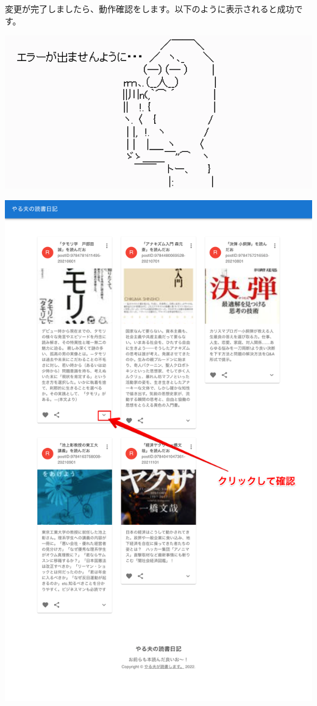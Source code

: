変更が完了しましたら、動作確認をします。以下のように表示されると成功です。

\begin{reviewimage}[H]%
\includegraphics[width=0.6\maxwidth]{./images/03-todo-with-react/pray04.png}%
\label{image:03-todo-with-react:pray04}
\end{reviewimage}

\clearpage

\begin{reviewimage}%
\includegraphics[width=0.7\maxwidth]{./images/03-todo-with-react/diaryBoad_done.png}%
\label{image:03-todo-with-react:diaryBoad_done}
\end{reviewimage}

